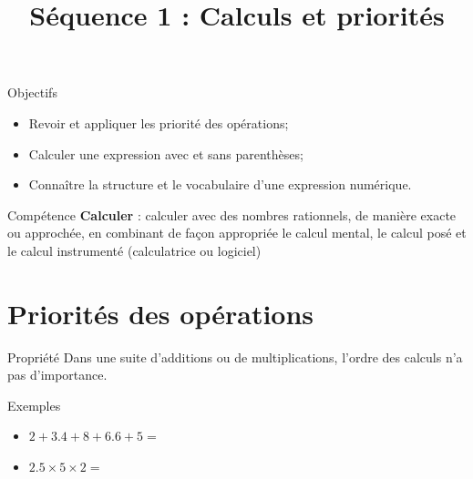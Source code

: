 \documentclass[xcolor={dvipsnames}]{beamer}
\title{Séquence 1 : Calculs et priorités}
\begin{document}
\begin{frame}
  \titlepage 
\end{frame}


	

\begin{frame}
	\begin{block}{Objectifs}
		\begin{itemize}
			\item Revoir et appliquer les priorité des opérations;
			\item Calculer une expression avec et sans parenthèses;
			\item Connaître la structure et le vocabulaire d'une expression numérique.		
			
			
		\end{itemize}
	\end{block}
		
		
	\begin{block}{Compétence}
		\textbf{Calculer} : calculer avec des nombres rationnels, de manière exacte  ou approchée, en combinant  de  façon  appropriée  le  calcul  mental,  le  calcul  posé  et  le  calcul instrumenté (calculatrice ou logiciel)
	\end{block}
\end{frame}


\section{Priorités des opérations}


\begin{frame}{}
	\begin{alertblock}{Propriété}
		Dans une suite d'additions ou de multiplications, l'ordre des calculs n'a pas d'importance.
	\end{alertblock}


	\begin{exampleblock}{Exemples}
		\begin{itemize}
			\item $2 + \num{3.4} + 8 + \num{6.6} + 5 = $ \vspace*{2cm}
			
			
			\item $\num{2.5} \times 5 \times 2 = $ \vspace*{1cm}
		\end{itemize}
	\end{exampleblock}
\end{frame}
\end{document}
